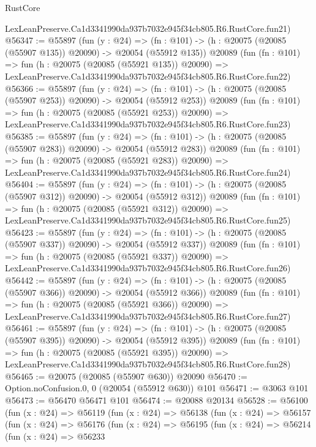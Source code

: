 \begin{lexlean}{RustCore}
\begin{coremodule}
    LexLeanPreserve.Ca1d3341990da937b7032e945f34cb805.R6.RustCore.fun21)
@56347 := @55897
    (fun (y : @24) =>
    (fn : @101) -> (h : @20075 (@20085 (@55907 @135)) @20090) -> @20054 (@55912 @135))
    @20089
    (fun (fn : @101) =>
    fun (h : @20075 (@20085 (@55921 @135)) @20090) =>
    LexLeanPreserve.Ca1d3341990da937b7032e945f34cb805.R6.RustCore.fun22)
@56366 := @55897
    (fun (y : @24) =>
    (fn : @101) -> (h : @20075 (@20085 (@55907 @253)) @20090) -> @20054 (@55912 @253))
    @20089
    (fun (fn : @101) =>
    fun (h : @20075 (@20085 (@55921 @253)) @20090) =>
    LexLeanPreserve.Ca1d3341990da937b7032e945f34cb805.R6.RustCore.fun23)
@56385 := @55897
    (fun (y : @24) =>
    (fn : @101) -> (h : @20075 (@20085 (@55907 @283)) @20090) -> @20054 (@55912 @283))
    @20089
    (fun (fn : @101) =>
    fun (h : @20075 (@20085 (@55921 @283)) @20090) =>
    LexLeanPreserve.Ca1d3341990da937b7032e945f34cb805.R6.RustCore.fun24)
@56404 := @55897
    (fun (y : @24) =>
    (fn : @101) -> (h : @20075 (@20085 (@55907 @312)) @20090) -> @20054 (@55912 @312))
    @20089
    (fun (fn : @101) =>
    fun (h : @20075 (@20085 (@55921 @312)) @20090) =>
    LexLeanPreserve.Ca1d3341990da937b7032e945f34cb805.R6.RustCore.fun25)
@56423 := @55897
    (fun (y : @24) =>
    (fn : @101) -> (h : @20075 (@20085 (@55907 @337)) @20090) -> @20054 (@55912 @337))
    @20089
    (fun (fn : @101) =>
    fun (h : @20075 (@20085 (@55921 @337)) @20090) =>
    LexLeanPreserve.Ca1d3341990da937b7032e945f34cb805.R6.RustCore.fun26)
@56442 := @55897
    (fun (y : @24) =>
    (fn : @101) -> (h : @20075 (@20085 (@55907 @366)) @20090) -> @20054 (@55912 @366))
    @20089
    (fun (fn : @101) =>
    fun (h : @20075 (@20085 (@55921 @366)) @20090) =>
    LexLeanPreserve.Ca1d3341990da937b7032e945f34cb805.R6.RustCore.fun27)
@56461 := @55897
    (fun (y : @24) =>
    (fn : @101) -> (h : @20075 (@20085 (@55907 @395)) @20090) -> @20054 (@55912 @395))
    @20089
    (fun (fn : @101) =>
    fun (h : @20075 (@20085 (@55921 @395)) @20090) =>
    LexLeanPreserve.Ca1d3341990da937b7032e945f34cb805.R6.RustCore.fun28)
@56465 := @20075 (@20085 (@55907 @630)) @20090
@56470 := Option.noConfusion.{0, 0} (@20054 (@55912 @630)) @101
@56471 := @3063 @101
@56473 := @56470 @56471 @101
@56474 := @20088 @20134
@56528 := @56100
    (fun (x : @24) =>
    @56119
      (fun (x : @24) =>
      @56138
        (fun (x : @24) =>
        @56157
          (fun (x : @24) =>
          @56176
            (fun (x : @24) =>
            @56195
              (fun (x : @24) =>
              @56214
                (fun (x : @24) =>
                @56233

\end{coremodule}
\end{lexlean}
